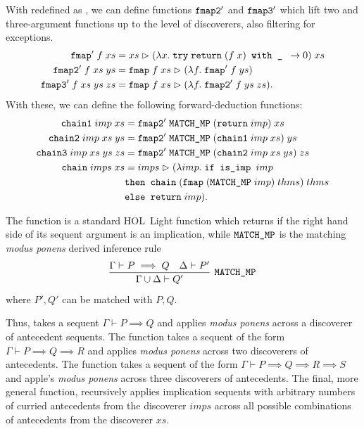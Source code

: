 With  redefined as , we can define functions $\texttt{fmap2}'$ and $\texttt{fmap3}'$ which lift two and three-argument functions up to the level of discoverers, also filtering for exceptions.
\begin{align*}
\texttt{fmap}'\;f\;xs &= xs \vartriangleright (\lambda x.\;\texttt{try}\; \texttt{return}\;(f\;x)  \texttt{ with \_ } \rightarrow 0)\;xs\\
\texttt{fmap2}'\;f\;xs\;ys &= \texttt{fmap}\;f\;xs \vartriangleright (\lambda f.\;\texttt{fmap}'\;f\;ys)\\
\texttt{fmap3}'\;f\;xs\;ys\;zs &= \texttt{fmap}\;f\;xs \vartriangleright (\lambda f.\;\texttt{fmap2}'\;f\;ys\;zs).
\end{align*}
With these, we can define the following forward-deduction functions:
\begin{align*}
\texttt{chain1}\;imp\;xs &= \texttt{fmap2}'\; \texttt{MATCH\_MP}\; (\texttt{return}\;imp)\;xs \\
\texttt{chain2}\;imp\;xs\;ys &= \texttt{fmap2}'\; \texttt{MATCH\_MP}\; (\texttt{chain1}\; imp\;xs)\;ys\\
\texttt{chain3}\;imp\;xs\;ys\;zs &= \texttt{fmap2}'\; \texttt{MATCH\_MP}\; (\texttt{chain2}\;imp\;xs\;ys)\;zs\\
\texttt{chain}\;imps\;xs &= imps \vartriangleright (\lambda imp.\;\texttt{if is\_imp } imp\\ &\texttt{then } \texttt{chain}\;(\texttt{fmap}\;(\texttt{MATCH\_MP}\;imp)\;thms)\;thms\\
&\texttt{else } \texttt{return}\; imp).
\end{align*}

The function  is a standard HOL~Light function which returns  if the right hand side of its sequent argument is an implication, while $\texttt{MATCH\_MP}$ is the matching \emph{modus ponens} derived inference rule
\begin{displaymath}\infer[\code{MATCH\_MP}]{\Gamma\cup\Delta \vdash Q'}{\Gamma \vdash P \implies Q&\Delta \vdash P'}
\end{displaymath}
where $P',Q'$ can be matched with $P,Q$. 

Thus,  takes a sequent $\Gamma \vdash P \implies Q$ and applies \emph{modus ponens} across a discoverer of antecedent sequents. The function  takes a sequent of the form $\Gamma \vdash P \implies Q \implies R$ and applies \emph{modus ponens} across two discoverers of antecedents. The function  takes a sequent of the form $\Gamma \vdash P \implies Q \implies R \implies S$ and apple's \emph{modus ponens} across three discoverers of antecedents. The final, more general  function, recursively applies implication sequents with arbitrary numbers of curried antecedents from the discoverer $imps$ across all possible combinations of antecedents from the discoverer $xs$.%

